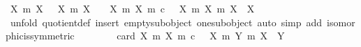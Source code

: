 \begin{isabellebody}
\ {\isachardoublequoteopen}{\isacharbraceleft}{\kern0pt}{\isacharbraceleft}{\kern0pt}{\isacharparenleft}{\kern0pt}X{\isacharcomma}{\kern0pt}\ m{\isacharparenright}{\kern0pt}{\isachardot}{\kern0pt}\ X\ {\isasymcong}\ {\isasymemptyset}{\isacharbraceright}{\kern0pt}{\isacharcomma}{\kern0pt}\ {\isacharbraceleft}{\kern0pt}{\isacharparenleft}{\kern0pt}X{\isacharcomma}{\kern0pt}\ m{\isacharparenright}{\kern0pt}{\isachardot}{\kern0pt}\ X\ {\isasymcong}\ {\isasymone}{\isacharbraceright}{\kern0pt}{\isacharbraceright}{\kern0pt}\ {\isasymsubseteq}\ {\isacharbraceleft}{\kern0pt}{\isacharparenleft}{\kern0pt}X{\isacharcomma}{\kern0pt}\ m{\isacharparenright}{\kern0pt}{\isachardot}{\kern0pt}\ {\isacharparenleft}{\kern0pt}X{\isacharcomma}{\kern0pt}\ m{\isacharparenright}{\kern0pt}\ {\isasymsubseteq}\isactrlsub c\ {\isasymone}{\isacharbraceright}{\kern0pt}\ {\isacharslash}{\kern0pt}{\isacharslash}{\kern0pt}\ {\isacharbraceleft}{\kern0pt}{\isacharparenleft}{\kern0pt}{\isacharparenleft}{\kern0pt}X{}{\isacharcomma}{\kern0pt}\ m{}{\isacharparenright}{\kern0pt}{\isacharcomma}{\kern0pt}\ X{}{\isacharcomma}{\kern0pt}\ m{}{\isacharparenright}{\kern0pt}{\isachardot}{\kern0pt}\ X{}\ {\isasymcong}\ X{}{\isacharbraceright}{\kern0pt}{\isachardoublequoteclose}\isanewline
\ \ \ \ \ \ \isamarkupfalse%
\ {\isacharparenleft}{\kern0pt}unfold\ quotient{\isacharunderscore}{\kern0pt}def{\isacharcomma}{\kern0pt}\ insert\ empty{\isacharunderscore}{\kern0pt}subobject\ one{\isacharunderscore}{\kern0pt}subobject{\isacharcomma}{\kern0pt}\ auto\ simp\ add{\isacharcolon}{\kern0pt}\ isomorphic{\isacharunderscore}{\kern0pt}is{\isacharunderscore}{\kern0pt}symmetric{\isacharparenright}{\kern0pt}\isanewline
\ \ \isamarkupfalse%
\isanewline
\ \ \isamarkupfalse%
\ \isamarkupfalse%
\ {\isachardoublequoteopen}card\ {\isacharparenleft}{\kern0pt}{\isacharbraceleft}{\kern0pt}{\isacharparenleft}{\kern0pt}X{\isacharcomma}{\kern0pt}\ m{\isacharparenright}{\kern0pt}{\isachardot}{\kern0pt}\ {\isacharparenleft}{\kern0pt}X{\isacharcomma}{\kern0pt}\ m{\isacharparenright}{\kern0pt}\ {\isasymsubseteq}\isactrlsub c\ {\isasymone}{\isacharbraceright}{\kern0pt}\ {\isacharslash}{\kern0pt}{\isacharslash}{\kern0pt}\ {\isacharbraceleft}{\kern0pt}{\isacharparenleft}{\kern0pt}{\isacharparenleft}{\kern0pt}X{\isacharcomma}{\kern0pt}\ m{}{\isacharparenright}{\kern0pt}{\isacharcomma}{\kern0pt}\ {\isacharparenleft}{\kern0pt}Y{\isacharcomma}{\kern0pt}\ m{}{\isacharparenright}{\kern0pt}{\isacharparenright}{\kern0pt}{\isachardot}{\kern0pt}\ X\ {\isasymcong}\ Y{\isacharbraceright}{\kern0pt}{\isacharparenright}{\kern0pt}\ {\isacharequal}{\kern0pt}\ {}{\isachardoublequoteclose}\isanewline

\end{isabellebody}
